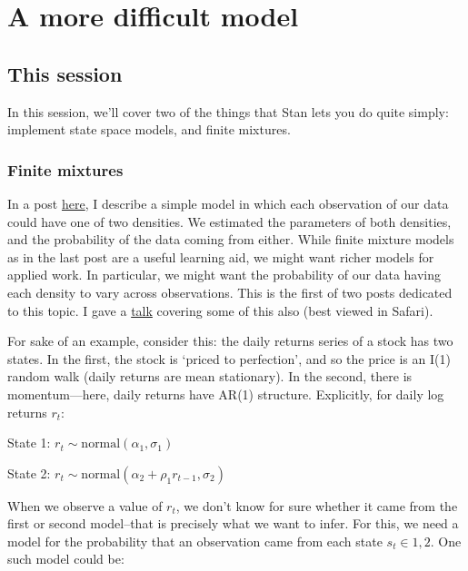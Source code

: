 \documentclass[]{book}
\begin{document}
\chapter{A more difficult model}\label{funtimeseries}

\section{This session}\label{this-session}

In this session, we'll cover two of the things that Stan lets you do
quite simply: implement state space models, and finite mixtures.

\subsection{Finite mixtures}\label{finite-mixtures}

In a post
\href{https://modernstatisticalworkflow.blogspot.com/2016/10/finite-mixture-models-in-stan.html}{here},
I describe a simple model in which each observation of our data could
have one of two densities. We estimated the parameters of both
densities, and the probability of the data coming from either. While
finite mixture models as in the last post are a useful learning aid, we
might want richer models for applied work. In particular, we might want
the probability of our data having each density to vary across
observations. This is the first of two posts dedicated to this topic. I
gave a
\href{https://dl.dropboxusercontent.com/u/63100926/become_a_bayesian_shareable.html}{talk}
covering some of this also (best viewed in Safari).

For sake of an example, consider this: the daily returns series of a
stock has two states. In the first, the stock is `priced to perfection',
and so the price is an I(1) random walk (daily returns are mean
stationary). In the second, there is momentum---here, daily returns have
AR(1) structure. Explicitly, for daily log returns \(r_{t}\):

State 1: \(r_{t} \sim \mbox{normal}(\alpha_{1}, \sigma_{1})\)

State 2:
\(r_{t} \sim \mbox{normal}(\alpha_{2} + \rho_{1} r_{t-1}, \sigma_{2})\)

When we observe a value of \(r_{t}\), we don't know for sure whether it
came from the first or second model--that is precisely what we want to
infer. For this, we need a model for the probability that an observation
came from each state \(s_{t}\in 1, 2\). One such model could be:
\end{document}

